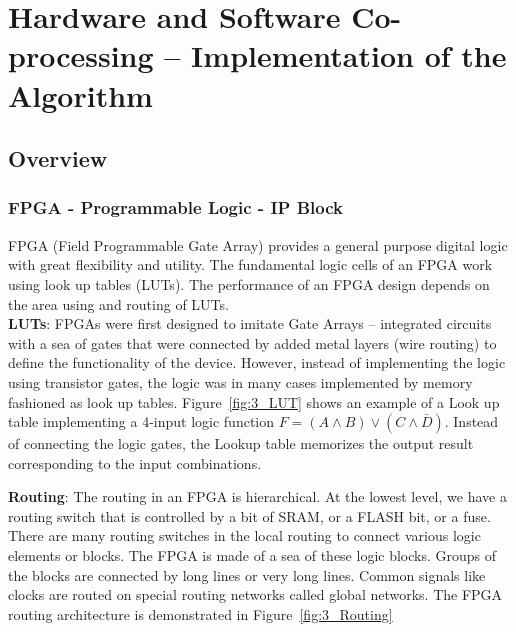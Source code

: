 \chapter{Hardware and Software Co-processing – Implementation of the Algorithm}
\label{chap:HSC}

\section{Overview}

\subsection{FPGA - Programmable Logic - IP Block}

FPGA (Field Programmable Gate Array) provides a general purpose digital logic with great flexibility and utility. The fundamental logic cells of an FPGA work using look up tables (LUTs). The performance of an FPGA design depends on the area using and routing of LUTs\cite{Dummies}. \\

\noindent \textbf{LUTs}: FPGAs were first designed to imitate Gate Arrays – integrated circuits with a sea of gates that were connected by added metal layers (wire routing) to define the functionality of the device. However, instead of implementing the logic using transistor gates, the logic was in many cases implemented by memory fashioned as look up tables. Figure~\ref{fig:3_LUT} shows an example of a Look up table implementing a 4-input logic function $F = (A \wedge B) \vee (C \wedge \bar{D})$. Instead of connecting the logic gates, the Lookup table memorizes the output result corresponding to the input combinations. \\


\noindent \textbf{Routing}: The routing in an FPGA is hierarchical. At the lowest level, we have a routing switch that is controlled by a bit of SRAM, or a FLASH bit, or a fuse. There are many routing switches in the local routing to connect various logic elements or blocks. The FPGA is made of a sea of these logic blocks. Groups of the blocks are connected by long lines or very long lines. Common signals like clocks are routed on special routing networks called global networks. The FPGA routing architecture is demonstrated in Figure~\ref{fig:3_Routing}\\

